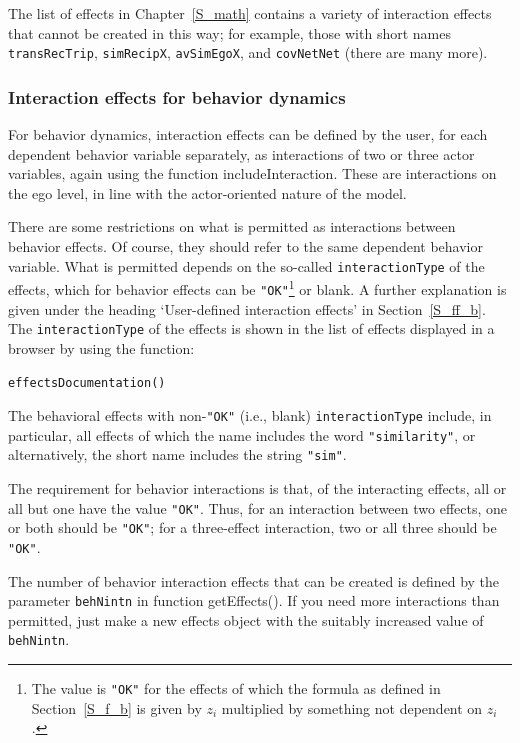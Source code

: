 \documentclass[a4paper,fleqn,11pt]{article}
\newcommand{\+}{\, + \,}
\newcommand{\sfn}[1]{\textsf{#1}}
\begin{document}
The list of effects in Chapter~\ref{S_math} contains a variety of
interaction effects that cannot be created in this way;
for example, those with short names
\texttt{transRecTrip}, \texttt{simRecipX},  \texttt{avSimEgoX},
and \texttt{covNetNet} (there are many more).

\subsubsection{Interaction effects for behavior dynamics}
\label{S_beh_infl}

For behavior dynamics, interaction effects can be defined
by the user, for each dependent behavior variable separately,
as interactions of two or three actor variables,
again using the function \textsf{includeInteraction}.
These are interactions on the ego level, in line with the
actor-oriented nature of the model.

There are some restrictions on what is permitted
as interactions between behavior effects.
Of course,  they should refer to the same dependent behavior variable.
What is permitted depends on the so-called \texttt{interactionType} of the
effects, which for behavior effects can be \texttt{"OK"}\footnote{The value
is \texttt{"OK"} for the effects of which the
formula as defined in Section~\ref{S_f_b}
is given by $z_i$ multiplied by something not dependent on $z_i$.}
or blank.
A further explanation is given under the heading `User-defined interaction effects'
in Section~\ref{S_ff_b}.
The \texttt{interactionType} of the effects
is shown in the list of effects displayed in a browser by using the function:

\verb|effectsDocumentation()|
\bigskip

The behavioral effects with non-\texttt{"OK"} (i.e., blank)
\texttt{interactionType} include,
in particular, all effects of which the name
includes the word \texttt{"similarity"},
or alternatively, the short name includes the string \texttt{"sim"}.

The requirement for behavior interactions is that,
of the interacting effects, all or all but one have
the value \texttt{"OK"}. Thus, for an interaction between two effects,
one or both should be \texttt{"OK"}; for a three-effect interaction,
two or all three should be \texttt{"OK"}.

The number of behavior interaction effects that can be created is defined by the
parameter \texttt{behNintn} in function \sfn{getEffects()}. If you need more
interactions than permitted, just make a new effects object with the
suitably increased value of \texttt{behNintn}.
\end{document}
